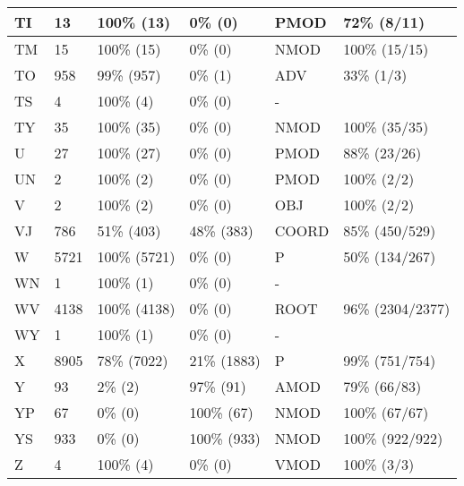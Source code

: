 \begin{figure*}
\begin{tabular}{|l|l|l|l||l|l|}
\hline
 TI & 13 & 100\% (13) & 0\% (0) & PMOD & 72\% (8/11) \\ 
\hline
 TM & 15 & 100\% (15) & 0\% (0) & NMOD & 100\% (15/15) \\ 
\hline
 TO & 958 & 99\% (957) & 0\% (1) & ADV & 33\% (1/3) \\ 
\hline
 TS & 4 & 100\% (4) & 0\% (0) & - &  \\ 
\hline
 TY & 35 & 100\% (35) & 0\% (0) & NMOD & 100\% (35/35) \\ 
\hline
 U & 27 & 100\% (27) & 0\% (0) & PMOD & 88\% (23/26) \\ 
\hline
 UN & 2 & 100\% (2) & 0\% (0) & PMOD & 100\% (2/2) \\ 
\hline
 V & 2 & 100\% (2) & 0\% (0) & OBJ & 100\% (2/2) \\ 
\hline
 VJ & 786 & 51\% (403) & 48\% (383) & COORD & 85\% (450/529) \\ 
\hline
 W & 5721 & 100\% (5721) & 0\% (0) & P & 50\% (134/267) \\ 
\hline
 WN & 1 & 100\% (1) & 0\% (0) & - &  \\ 
\hline
 WV & 4138 & 100\% (4138) & 0\% (0) & ROOT & 96\% (2304/2377) \\ 
\hline
 WY & 1 & 100\% (1) & 0\% (0) & - &  \\ 
\hline
 X & 8905 & 78\% (7022) & 21\% (1883) & P & 99\% (751/754) \\ 
\hline
 Y & 93 & 2\% (2) & 97\% (91) & AMOD & 79\% (66/83) \\ 
\hline
 YP & 67 & 0\% (0) & 100\% (67) & NMOD & 100\% (67/67) \\ 
\hline
 YS & 933 & 0\% (0) & 100\% (933) & NMOD & 100\% (922/922) \\ 
\hline
 Z & 4 & 100\% (4) & 0\% (0) & VMOD & 100\% (3/3) \\ 
\hline
\end{tabular}
\end{figure*}
